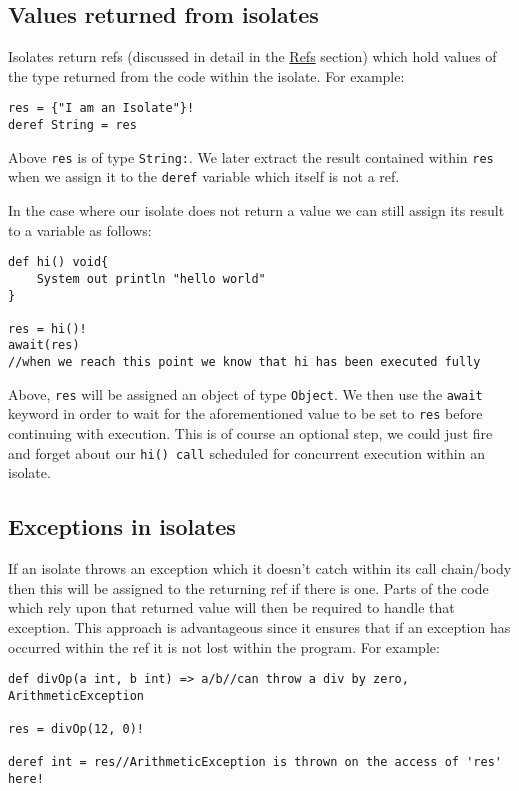 \documentclass[conc-doc]{subfiles}
\begin{document}
\subsection{Values returned from isolates}
Isolates return refs (discussed in detail in the \hyperref[sec:refs]{Refs} section) which hold values of the type returned from the code within the isolate. For example:

\begin{lstlisting}
res = {"I am an Isolate"}!
deref String = res
\end{lstlisting}

Above \lstinline{res} is of type \lstinline{String:}. We later extract the result contained within \lstinline{res} when we assign it to the \lstinline{deref} variable which itself is not a ref.

In the case where our isolate does not return a value we can still assign its result to a variable as follows:

\begin{lstlisting}
def hi() void{
	System out println "hello world"
}

res = hi()!
await(res)
//when we reach this point we know that hi has been executed fully
\end{lstlisting}

Above, \lstinline{res} will be assigned an object of type \lstinline{Object}. We then use the \lstinline{await} keyword in order to wait for the aforementioned value to be set to \lstinline{res} before continuing with execution. This is of course an optional step, we could just fire and forget about our \lstinline{hi() call} scheduled for concurrent execution within an isolate.

\subsection{Exceptions in isolates}
If an isolate throws an exception which it doesn't catch within its call chain/body then this will be assigned to the returning ref if there is one. Parts of the code which rely upon that returned value will then be required to handle that exception. This approach is advantageous since it ensures that if an exception has occurred within the ref it is not lost within the program. For example:


\begin{lstlisting}
def divOp(a int, b int) => a/b//can throw a div by zero, ArithmeticException

res = divOp(12, 0)!

deref int = res//ArithmeticException is thrown on the access of 'res' here!
\end{lstlisting}
\end{document}
